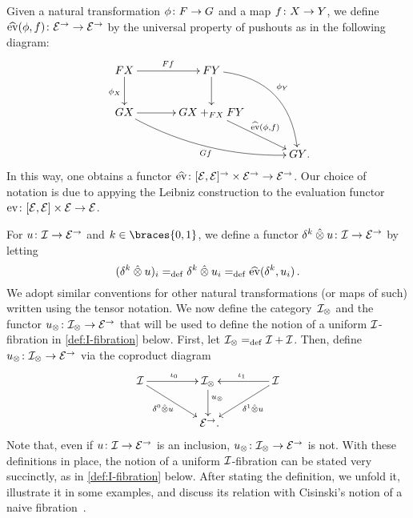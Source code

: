 \documentclass[reqno,10pt,a4paper,oneside,draft]{amsart}
\begin{document}
Given a natural transformation $\phi \co F \to G$ and a map $f \co X \to Y$, we define $\hateval(\phi, f) \co \catE^\to \to \catE^\to$ by the universal property of pushouts as in the following diagram:
\begin{equation} \label{definition-of-hateval}
\begin{aligned}
\xymatrix@C=1.2cm{
  FX
  \ar[r]^{Ff}
  \ar[d]_{\phi_X}
&
  FY
  \ar@/^2pc/[ddr]^{\phi_Y}
  \ar[d]
&\\
  GX
  \ar@/_1pc/[drr]_{Gf}
  \ar[r]
&
  GX +_{FX} FY
  \ar[dr]^-{\hateval(\phi, f)}
&\\&&
  GY
\rlap{.}}
\end{aligned}
\end{equation}
In this way, one obtains a functor $\hateval \co [\catE, \catE]^\to \times \catE^\to \to \catE^\to$.
Our choice of notation is due to appying the Leibniz construction to the evaluation functor $\eval \co [\catE,\catE] \times \calE \to \catE$.

For $u \co \cal{I} \to \catE^\to$ and $k \in \braces{0, 1}$, we define a functor $\kcyl \hatotimes u \co \cal{I} \to \catE^\to$ by letting
\[
  (\kcyl \hatotimes u)_i \defeq \kcyl \hatotimes u_i  \defeq \hateval(\kcyl, u_i) \, .
\]
We adopt similar conventions for other natural transformations (or maps of such) written using the tensor notation.
We now define the category~$\cal{I}_\otimes$ and the functor $u_\otimes \co \cal{I}_\otimes \to \catE^\to$ that will be used to define the notion of a uniform $\cal{I}$-fibration in \cref{def:I-fibration} below.
First, let $\cal{I}_\otimes \defeq \cal{I} + \cal{I}$.
Then, define $u_\otimes \co \cal{I}_\otimes \to \catE^\to$ via the coproduct diagram
\begin{equation}
\label{equ:u-tensor}
\begin{gathered}
\xymatrix@C+2em{
  \cal{I}
  \ar[r]^{\iota_0}
  \ar[dr]_-{\lcyl \hatotimes u}
&
  \cal{I}_\otimes
  \ar[d]^(.4){u_\otimes}
&
  \cal{I}
  \ar[dl]^-{\rcyl \hatotimes u}
  \ar[l]_{\iota_1}
\\&
  \catE^\to
\rlap{.}}
\end{gathered}
\end{equation}
Note that, even if $u \co \cal{I} \to \catE^\to$ is an inclusion, $u_\otimes \co \cal{I}_\otimes \to \catE^\to$ is not.
With these definitions in place, the notion of a uniform $\cal{I}$-fibration can be stated very succinctly, as in \cref{def:I-fibration} below.
After stating the definition, we unfold it, illustrate it in some examples, and discuss its relation with Cisinski's notion of a naive fibration~\cite{cisinski-asterisque}.
\end{document}

